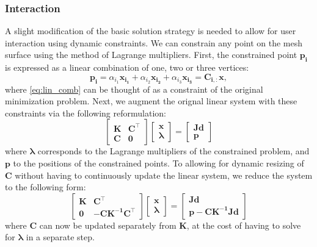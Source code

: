 \subsubsection{Interaction}
A slight modification of the basic solution strategy is needed to allow for user interaction using dynamic constraints. We can constrain any point on the mesh surface using the method of Lagrange multipliers. First, the constrained point $\mathbf{p_i}$ is expressed as a linear combination of one, two or three vertices:
\begin{equation}
\label{eq:lin_comb}
\mathbf{p_i} =
\alpha_{i_1} \mathbf{x_{i_1}} +
\alpha_{i_2} \mathbf{x_{i_2}} +
\alpha_{i_3} \mathbf{x_{i_3}} =
\mathbf{C_{i,:} x},
\end{equation}
where \autoref{eq:lin_comb} can be thought of as a constraint of the original minimization problem. Next, we augment the orignal linear system with these constraints via the following reformulation:
\begin{equation}
    \begin{bmatrix}
        \mathbf{K} & \mathbf{C}^\intercal \\
        \mathbf{C} & \mathbf{0}
    \end{bmatrix}
    \begin{bmatrix}
        \mathbf{x} \\
        \boldsymbol{\lambda}
    \end{bmatrix}
    =
    \begin{bmatrix}
        \mathbf{Jd} \\
        \mathbf{p}
    \end{bmatrix}
\end{equation}
where $\boldsymbol{\lambda}$ corresponds to the Lagrange multipliers of the constrained problem, and $\mathbf{p}$ to the positions of the constrained points. To allowing for dynamic resizing of $\mathbf{C}$ without having to continuously update the linear system, we reduce the system to the following form:
\begin{equation}
  \begin{bmatrix}
    \mathbf{K} & \mathbf{C}^\intercal \\
    \mathbf{0} & -\mathbf{CK^{-1}C^\intercal}
  \end{bmatrix}
  \begin{bmatrix}
    \mathbf{x} \\
    \boldsymbol{\lambda}
  \end{bmatrix}
  =
  \begin{bmatrix}
    \mathbf{Jd} \\
    \mathbf{p} - \mathbf{CK^{-1}Jd}
  \end{bmatrix}
\end{equation}
where $\mathbf{C}$ can now be updated separately from $\mathbf{K}$, at the cost of having to solve for $\boldsymbol{\lambda}$ in a separate step.

